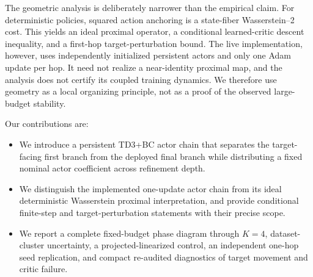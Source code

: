 The geometric analysis is deliberately narrower than the empirical claim. For deterministic policies, squared action anchoring is a state-fiber Wasserstein--2 cost. This yields an ideal proximal operator, a conditional learned-critic descent inequality, and a first-hop target-perturbation bound. The live implementation, however, uses independently initialized persistent actors and only one Adam update per hop. It need not realize a near-identity proximal map, and the analysis does not certify its coupled training dynamics. We therefore use geometry as a local organizing principle, not as a proof of the observed large-budget stability.

Our contributions are:
\begin{itemize}
\item We introduce a persistent TD3+BC actor chain that separates the target-facing first branch from the deployed final branch while distributing a fixed nominal actor coefficient across refinement depth.
\item We distinguish the implemented one-update actor chain from its ideal deterministic Wasserstein proximal interpretation, and provide conditional finite-step and target-perturbation statements with their precise scope.
\item We report a complete fixed-budget phase diagram through $K=4$, dataset-cluster uncertainty, a projected-linearized control, an independent one-hop seed replication, and compact re-audited diagnostics of target movement and critic failure.
\end{itemize}
